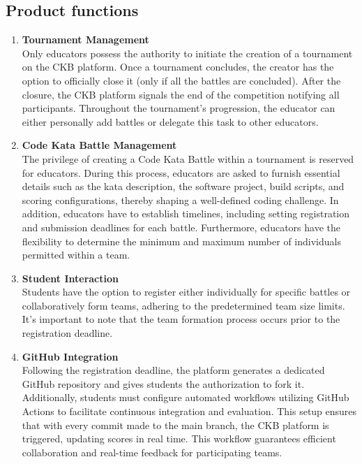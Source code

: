 \subsection{Product functions}
\begin{enumerate}
    \item \textbf{Tournament Management} \\
    Only educators possess the authority to initiate the creation of a tournament on the CKB platform. Once a tournament concludes, the creator has the option to officially close it (only if all the battles are concluded). After the closure, the CKB platform signals the end of the competition notifying all participants. Throughout the tournament's progression, the educator can either personally add battles or delegate this task to other educators.

    \item \textbf{Code Kata Battle Management} \\
    The privilege of creating a Code Kata Battle within a tournament is reserved for educators. During this process, educators are asked to furnish essential details such as the kata description, the software project, build scripts, and scoring configurations, thereby shaping a well-defined coding challenge. In addition, educators have to establish timelines, including setting registration and submission deadlines for each battle. Furthermore, educators have the flexibility to determine the minimum and maximum number of individuals permitted within a team.

    \item \textbf{Student Interaction} \\
    Students have the option to register either individually for specific battles or collaboratively form teams, adhering to the predetermined team size limits. It's important to note that the team formation process occurs prior to the registration deadline.

    \item \textbf{GitHub Integration} \\
    Following the registration deadline, the platform generates a dedicated GitHub repository and gives students the authorization to fork it. Additionally, students must configure automated workflows utilizing GitHub Actions to facilitate continuous integration and evaluation. This setup ensures that with every commit made to the main branch, the CKB platform is triggered, updating scores in real time. This workflow guarantees efficient collaboration and real-time feedback for participating teams.


\end{enumerate}
